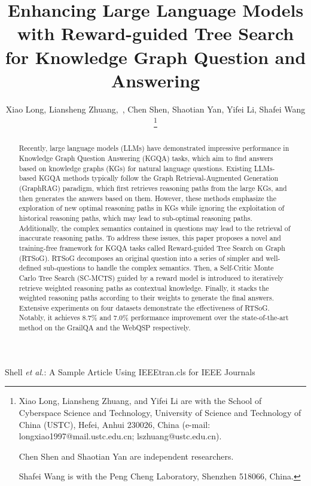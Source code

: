 \documentclass[lettersize,journal]{IEEEtran}
\begin{document}
\title{Enhancing Large Language Models with Reward-guided Tree Search for Knowledge Graph Question and Answering}

\author{Xiao Long, Liansheng Zhuang,~, Chen Shen, Shaotian Yan, Yifei Li, Shafei Wang 
\thanks{Xiao Long, Liansheng Zhuang, and Yifei Li are with the
School of Cyberspace Science and Technology, University of Science
and Technology of China (USTC), Hefei, Anhui 230026, China (e-mail:
longxiao1997@mail.ustc.edu.cn; lszhuang@ustc.edu.cn).

Chen Shen and Shaotian Yan are independent researchers.

Shafei Wang is with the Peng Cheng Laboratory, Shenzhen 518066, China.}%
}

%
{Shell \MakeLowercase{\textit{et al.}}: A Sample Article Using IEEEtran.cls for IEEE Journals}


\maketitle

\begin{abstract}
Recently, large language models (LLMs) have demonstrated impressive performance in Knowledge Graph Question Answering (KGQA) tasks, which aim to find answers based on knowledge graphs (KGs) for natural language questions. 
Existing LLMs-based KGQA methods typically follow the Graph Retrieval-Augmented Generation (GraphRAG) paradigm, which first retrieves reasoning paths from the large KGs, and then generates the answers based on them. 
However, these methods emphasize the exploration of new optimal reasoning paths in KGs while ignoring the exploitation of historical reasoning paths, which may lead to sub-optimal reasoning paths. Additionally, the complex semantics contained in questions may lead to the retrieval of inaccurate reasoning paths.
To address these issues, this paper proposes a novel and training-free framework for KGQA tasks called Reward-guided Tree Search on Graph (RTSoG). RTSoG decomposes an original question into a series of simpler and well-defined sub-questions to handle the complex semantics. 
Then, a Self-Critic Monte Carlo Tree Search (SC-MCTS) guided by a reward model is introduced to iteratively retrieve weighted reasoning paths as contextual knowledge. 
Finally, it stacks the weighted reasoning paths according to their weights to generate the final answers. Extensive experiments on four datasets demonstrate the effectiveness of RTSoG. Notably, it achieves 8.7\% and 7.0\% performance improvement over the state-of-the-art method on the GrailQA and the WebQSP respectively.
\end{abstract}
\end{document}

